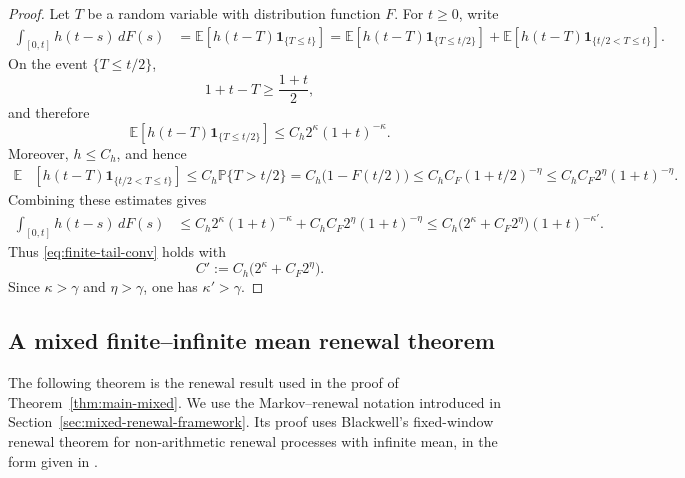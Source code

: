 \documentclass[reqno,final,11pt]{amsart}
\newcommand{\E}{\mathbb E}
\newcommand{\Pbb}{\mathbb P}
\newcommand{\ind}[1]{\mathbf 1_{\{#1\}}}
\theoremstyle{plain}
\theoremstyle{definition}
\theoremstyle{remark}
\numberwithin{equation}{section}
\begin{document}
\begin{proof}
Let \(T\) be a random variable with distribution function \(F\). For \(t\ge0\), write
\[
\begin{split}
  \int_{[0,t]}h(t-s)\,dF(s)
  &=
  \E\left[h(t-T)\ind{T\le t}\right]=
  \E\left[h(t-T)\ind{T\le t/2}\right]
  +
  \E\left[h(t-T)\ind{t/2<T\le t}\right].
\end{split}
\]
On the event \(\{T\le t/2\}\),
\[
  1+t-T\ge\frac{1+t}{2},
\]
and therefore
\[
  \E\left[h(t-T)\ind{T\le t/2}\right]
  \le C_h2^\kappa(1+t)^{-\kappa}.
\]
Moreover, \(h\le C_h\), and hence
\[
\begin{split}
  \E&\left[h(t-T)\ind{t/2<T\le t}\right]
  \le C_h\Pbb\{T>t/2\}=C_h\bigl(1-F(t/2)\bigr)\le C_hC_F(1+t/2)^{-\eta}\le C_hC_F2^\eta(1+t)^{-\eta}.
\end{split}
\]
Combining these estimates gives
\[
\begin{split}
  \int_{[0,t]}h(t-s)\,dF(s)
  &\le
  C_h2^\kappa(1+t)^{-\kappa}
  +C_hC_F2^\eta(1+t)^{-\eta}\le
  C_h\bigl(2^\kappa+C_F2^\eta\bigr)
  (1+t)^{-\kappa'}.
\end{split}
\]
Thus \eqref{eq:finite-tail-conv} holds with
\[
  C':=C_h\bigl(2^\kappa+C_F2^\eta\bigr).
\]
Since \(\kappa>\gamma\) and \(\eta>\gamma\), one has \(\kappa'>\gamma\).
\end{proof}



\subsection{A mixed finite--infinite mean renewal theorem}
\label{sec:renewal}

The following theorem is the renewal result used in the proof of Theorem~\ref{thm:main-mixed}. We use the Markov--renewal notation introduced in Section~\ref{sec:mixed-renewal-framework}. Its proof uses Blackwell's fixed-window renewal theorem for non-arithmetic renewal processes with infinite mean, in the form given in \cite[Eq.~(1.1), p.~88]{Thorisson1987}.
\end{document}
